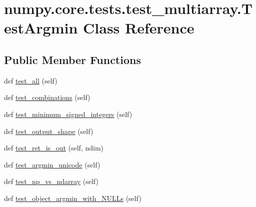 \hypertarget{classnumpy_1_1core_1_1tests_1_1test__multiarray_1_1TestArgmin}{}\section{numpy.\+core.\+tests.\+test\+\_\+multiarray.\+Test\+Argmin Class Reference}
\label{classnumpy_1_1core_1_1tests_1_1test__multiarray_1_1TestArgmin}
\subsection*{Public Member Functions}
\begin{DoxyCompactItemize}
\item 
def \hyperlink{classnumpy_1_1core_1_1tests_1_1test__multiarray_1_1TestArgmin_a6a777253c5245fd9dbb12d6ecf2bb1da}{test\+\_\+all} (self)
\item 
def \hyperlink{classnumpy_1_1core_1_1tests_1_1test__multiarray_1_1TestArgmin_a148451bfede89b7f20b646353fe4301b}{test\+\_\+combinations} (self)
\item 
def \hyperlink{classnumpy_1_1core_1_1tests_1_1test__multiarray_1_1TestArgmin_a317d2129126e60237bdb989e17e3214f}{test\+\_\+minimum\+\_\+signed\+\_\+integers} (self)
\item 
def \hyperlink{classnumpy_1_1core_1_1tests_1_1test__multiarray_1_1TestArgmin_acded45eac625fcb246f865955e16b59d}{test\+\_\+output\+\_\+shape} (self)
\item 
def \hyperlink{classnumpy_1_1core_1_1tests_1_1test__multiarray_1_1TestArgmin_a00daa9e8d1e7ca0c22b4194dcf25a533}{test\+\_\+ret\+\_\+is\+\_\+out} (self, ndim)
\item 
def \hyperlink{classnumpy_1_1core_1_1tests_1_1test__multiarray_1_1TestArgmin_a13b6c9078ea9cc81696e3005bfc963a1}{test\+\_\+argmin\+\_\+unicode} (self)
\item 
def \hyperlink{classnumpy_1_1core_1_1tests_1_1test__multiarray_1_1TestArgmin_affa7313d05679cb32e87235085226a2f}{test\+\_\+np\+\_\+vs\+\_\+ndarray} (self)
\item 
def \hyperlink{classnumpy_1_1core_1_1tests_1_1test__multiarray_1_1TestArgmin_a32ed43b434513c9a5868e76ddd7bb4a9}{test\+\_\+object\+\_\+argmin\+\_\+with\+\_\+\+N\+U\+L\+Ls} (self)
\end{DoxyCompactItemize}
